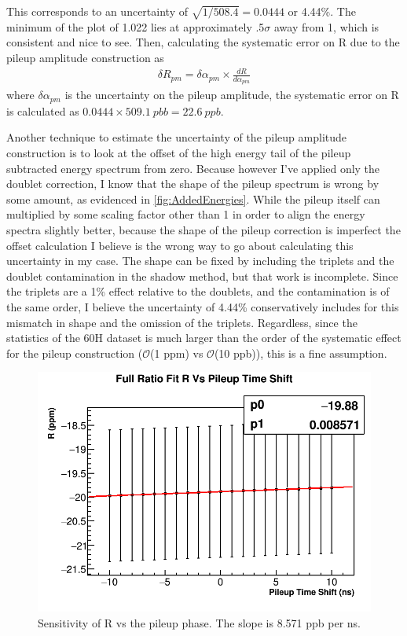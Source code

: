 	This corresponds to an uncertainty of $\sqrt{1/508.4} = 0.0444$ or 4.44\%. The minimum of the \chisq plot of 1.022 lies at approximately .5$\sigma$ away from 1, which is consistent and nice to see. Then, calculating the systematic error on R due to the pileup amplitude construction as 
		\begin{align}
			\delta R_{pm} = \delta\alpha_{pm} \times \frac{dR}{d\alpha_{pm}}
		\end{align}
	where $\delta\alpha_{pm}$ is the uncertainty on the pileup amplitude, the systematic error on R is calculated as $0.0444 \times \SI{509.1}{pbb} = \SI{22.6}{ppb}$.

	Another technique to estimate the uncertainty of the pileup amplitude construction is to look at the offset of the high energy tail of the pileup subtracted energy spectrum from zero. Because however I've applied only the doublet correction, I know that the shape of the pileup spectrum is wrong by some amount, as evidenced in \ref{fig:AddedEnergies}. While the pileup itself can multiplied by some scaling factor other than 1 in order to align the energy spectra slightly better, because the shape of the pileup correction is imperfect the offset calculation I believe is the wrong way to go about calculating this uncertainty in my case. The shape can be fixed by including the triplets and the doublet contamination in the shadow method, but that work is incomplete. Since the triplets are a 1\% effect relative to the doublets, and the contamination is of the same order, I believe the uncertainty of 4.44\% conservatively includes for this mismatch in shape and the omission of the triplets. Regardless, since the statistics of the 60H dataset is much larger than the order of the systematic effect for the pileup construction ($\mathcal{O}$(1 ppm) vs $\mathcal{O}$(10 ppb)), this is a fine assumption.

	\begin{figure}[h]
		\centering
		\includegraphics[width=.5\textwidth]{RatioCBO_R_Vs_PileupTimeShift_Canv}
	    \caption[PileupPhase]{Sensitivity of R vs the pileup phase. The slope is 8.571 ppb per ns.}
	    \label{fig:PileupPhase}
	\end{figure}

